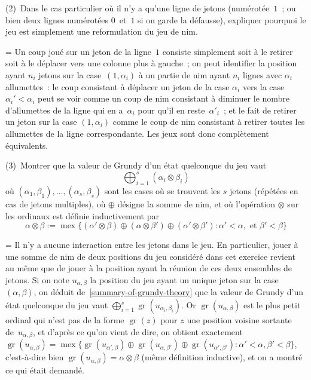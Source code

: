 \documentclass[12pt,a4paper]{article}
\theoremstyle{definition}
\newcommand{\mex}{\operatorname{mex}}
\newcommand{\gr}{\operatorname{gr}}
\newif\ifcorrige
\newenvironment{corrige}%
{\ifcorrige\relax\else\setbox0=\vbox\bgroup\fi%
\smallbreak\noindent{\underbar{\textit{Corrigé.}}\quad}}
{{\hbox{}\nobreak\hfill\checkmark}%
\ifcorrige\relax\else\egroup\fi\par}
\begin{document}
(2) Dans le cas particulier où il n'y a qu'une ligne de jetons
(numérotée $1$ ; ou bien deux lignes numérotées $0$ et $1$ si on garde
la défausse), expliquer pourquoi le jeu est simplement une
reformulation du jeu de nim.

\begin{corrige}
Un coup joué sur un jeton de la ligne $1$ consiste simplement soit à
le retirer soit à le déplacer vers une colonne plus à gauche ; on peut
identifier la position ayant $n_i$ jetons sur la case $(1,\alpha_i)$ à
un partie de nim ayant $n_i$ lignes avec $\alpha_i$ allumettes : le
coup consistant à déplacer un jeton de la case $\alpha_i$ vers la case
$\alpha_i' < \alpha_i$ peut se voir comme un coup de nim consistant à
diminuer le nombre d'allumettes de la ligne qui en a $\alpha_i$ pour
qu'il en reste $\alpha'_i$ ; et le fait de retirer un jeton sur la
case $(1,\alpha_i)$ comme le coup de nim consistant à retirer toutes
les allumettes de la ligne correspondante.  Les jeux sont donc
complètement équivalents.
\end{corrige}

\smallbreak

(3) Montrer que la valeur de Grundy d'un état quelconque du jeu vaut
\[
\bigoplus_{i=1}^s (\alpha_i\otimes\beta_i)
\]
où $(\alpha_1,\beta_1),\ldots,(\alpha_s,\beta_s)$ sont les cases où se
trouvent les $s$ jetons (répétées en cas de jetons multiples), où
$\oplus$ désigne la somme de nim, et où l'opération $\otimes$ sur les
ordinaux est définie inductivement par
\[
\alpha\otimes\beta := \mex\Big\{(\alpha'\otimes\beta)
\oplus (\alpha\otimes\beta') \oplus (\alpha'\otimes\beta')
: \alpha'<\alpha,\text{~et~}\beta'<\beta\Big\}
\tag{*}
\]

\begin{corrige}
Il n'y a aucune interaction entre les jetons dans le jeu.  En
particulier, jouer à une somme de nim de deux positions du jeu
considéré dans cet exercice revient au même que de jouer à la position
ayant la réunion de ces deux ensembles de jetons.  Si on note
$u_{\alpha,\beta}$ la position du jeu ayant un unique jeton sur la
case $(\alpha,\beta)$, on déduit de \ref{summary-of-grundy-theory} que
la valeur de Grundy d'un état quelconque du jeu vaut
$\bigoplus_{i=1}^s \gr(u_{\alpha_i,\beta_i})$.  Or
$\gr(u_{\alpha,\beta})$ est le plus petit ordinal qui n'est pas de la
forme $\gr(z)$ pour $z$ une position voisine sortante
de $u_{\alpha,\beta}$, et d'après ce qu'on vient de dire, on obtient
exactement $\gr(u_{\alpha,\beta}) = \mex\big\{\gr(u_{\alpha',\beta})
\oplus \gr(u_{\alpha,\beta'}) \oplus \gr(u_{\alpha',\beta'}) :
\alpha'<\alpha, \beta'<\beta\big\}$, c'est-à-dire bien
$\gr(u_{\alpha,\beta}) = \alpha\otimes\beta$ (même définition
inductive), et on a montré ce qui était demandé.
\end{corrige}
\end{document}
